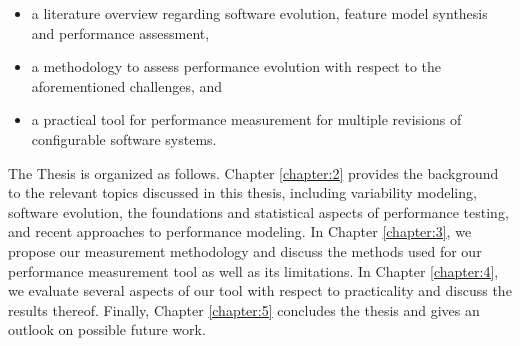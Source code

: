 \begin{itemize}
\item a literature overview regarding software evolution, feature model
synthesis and performance assessment,
\item a methodology to assess performance evolution with respect to the
aforementioned challenges, and
\item a practical tool for performance measurement for multiple revisions of
configurable software systems.
\end{itemize}

The Thesis is organized as follows. Chapter \ref{chapter:2} provides the
background to the relevant topics discussed in this thesis, including
variability modeling, software evolution, the foundations and statistical
aspects of performance testing, and recent approaches to performance modeling. In
Chapter \ref{chapter:3}, we propose our measurement methodology and discuss
the methods used for our performance measurement tool as well as its
limitations. In Chapter \ref{chapter:4}, we evaluate several aspects of our
tool with respect to practicality and discuss the results thereof. Finally,
Chapter \ref{chapter:5} concludes the thesis and gives an outlook on possible
future work.
